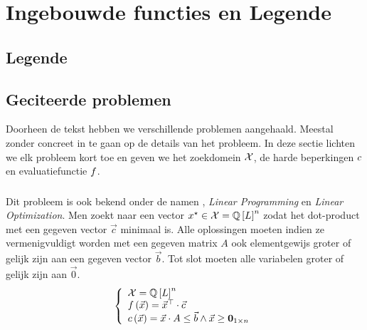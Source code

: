 \chapter{Ingebouwde functies en Legende}


\section{Legende}

\section{Geciteerde problemen}

Doorheen de tekst hebben we verschillende problemen aangehaald. Meestal zonder concreet in te gaan op de details van het probleem. In deze sectie lichten we elk probleem kort toe en geven we het zoekdomein $\ConfigSet$, de harde beperkingen $\hcfun$ en evaluatiefunctie $\evalfun$.

\subsection{}

Dit probleem is ook bekend onder de namen , \emph{Linear Programming} en \emph{Linear Optimization}. Men zoekt naar een vector $\xstar\in\ConfigSet=\QbitSet{L}^n$ zodat het dot-product met een gegeven vector $\vec{c}$ minimaal is. Alle oplossingen moeten indien ze vermenigvuldigt worden met een gegeven matrix $A$ ook elementgewijs groter of gelijk zijn aan een gegeven vector $\vec{b}$. Tot slot moeten alle variabelen groter of gelijk zijn aan $\vec{0}$.
\begin{equation}
\guards{
\ConfigSet=\QbitSet{L}^n\\
\fun{\evalfun}{\vec{x}}=\transpose{\vec{x}}\cdot\vec{c}\\
\fun{\hcfun}{\vec{x}}=\vec{x}\cdot A\leq\vec{b}\wedge\vec{x}\geq\zeromatrix[1\times n]
}
\end{equation}


\subsection{}

\subsection{}

